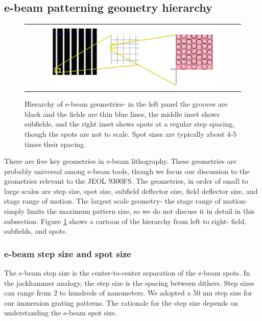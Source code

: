\documentclass[]{spie}  %
\begin{document}
\subsection{e-beam patterning geometry hierarchy}

\begin{figure}
\begin{center}
 \begin{tabular}{c}
    \includegraphics[width=0.8\textwidth]{figs/Field_sizes_cascade_02.png}
   \end{tabular}
  \end{center}
  \caption[e-beam Hierarchy]{\label{fig:Hierarchy} Hierarchy of e-beam geometries- in the left panel the grooves are black and the fields are thin blue lines, the middle inset shows subfields, and the right inset shows spots at a regular step spacing, though the spots are not to scale.  Spot sizes are typically about 4-5 times their spacing.}
\end{figure}


There are five key geometries in e-beam lithography.  These geometries are probably universal among e-beam tools, though we focus our discussion to the geometries relevant to the JEOL 9300FS.  The geometries, in order of small to large scales are step size, spot size, subfield deflector size, field deflector size, and stage range of motion.  The largest scale geometry- the stage range of motion- simply limits the maximum pattern size, so we do not discuss it in detail in this subsection.  Figure \ref{fig:Hierarchy} shows a cartoon of the hierarchy from left to right- field, subfields, and spots.

\subsubsection{e-beam step size and spot size}
The e-beam step size is the center-to-center separation of the e-beam spots.  In the jackhammer analogy, the step size is the spacing between dithers.  Step sizes can range from 2 to hundreds of nanometers.  We adopted a 50 nm step size for our immersion grating patterns.  The rationale for the step size depends on understanding the e-beam spot size.  
\end{document}
